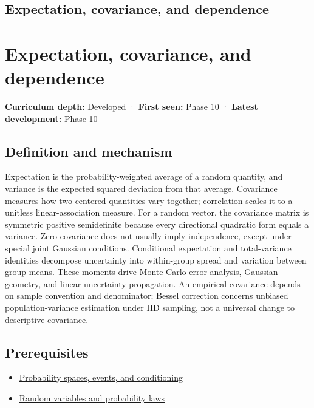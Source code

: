 \hypertarget{appendix-54c383df9992}{}
\section*{Expectation, covariance, and dependence}
\chapter{Expectation, covariance, and dependence}\label{appendix-54c383df9992-expectation-covariance-and-dependence}

\textbf{Curriculum depth:} Developed · \textbf{First seen:} Phase 10 · \textbf{Latest development:} Phase 10

\section{Definition and mechanism}\label{appendix-54c383df9992-definition-and-mechanism}

Expectation is the probability-weighted average of a random quantity, and variance is the expected squared deviation from that average. Covariance measures how two centered quantities vary together; correlation scales it to a unitless linear-association measure. For a random vector, the covariance matrix is symmetric positive semidefinite because every directional quadratic form equals a variance. Zero covariance does not usually imply independence, except under special joint Gaussian conditions. Conditional expectation and total-variance identities decompose uncertainty into within-group spread and variation between group means. These moments drive Monte Carlo error analysis, Gaussian geometry, and linear uncertainty propagation. An empirical covariance depends on sample convention and denominator; Bessel correction concerns unbiased population-variance estimation under IID sampling, not a universal change to descriptive covariance.

\section{Prerequisites}\label{appendix-54c383df9992-prerequisites}

\begin{itemize}
\tightlist
\item
  \hyperref[appendix-f1ef323f6ed7]{Probability spaces, events, and conditioning}
\item
  \hyperref[appendix-4d0203f7944f]{Random variables and probability laws}
\end{itemize}

